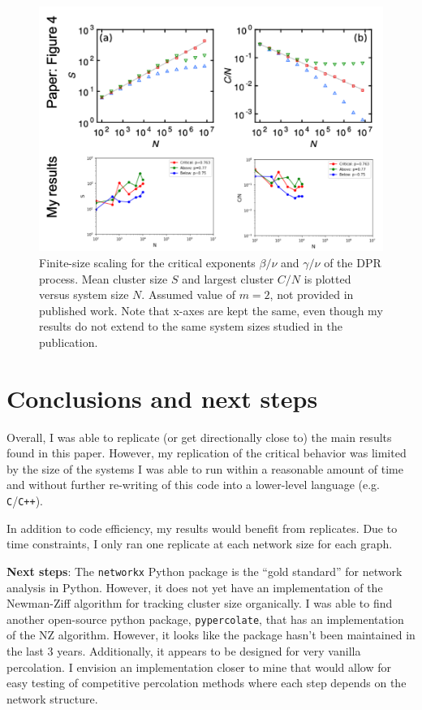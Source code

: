 \documentclass[11pt]{article}   	%
\begin{document}
\begin{figure}[t]
\begin{center}
\includegraphics[width=\textwidth]{fig/fig4_compiled.png}
\caption{Finite-size scaling for the critical exponents $\beta/\nu$ and $\gamma/\nu$ of the DPR process. Mean cluster size $S$ and largest cluster $C/N$ is plotted versus system size $N$. Assumed value of $m=2$, not provided in published work. Note that x-axes are kept the same, even though my results do not extend to the same system sizes studied in the publication.}
\label{fig:fig4}
\end{center}
\end{figure}


\section{Conclusions and next steps}
Overall, I was able to replicate (or get directionally close to) the main results found in this paper.
However, my replication of the critical behavior was limited by the size of the systems I was able to run within a reasonable amount of time and without further re-writing of this code into a lower-level language (e.g. \verb|C|/\verb|C++|).

In addition to code efficiency, my results would benefit from replicates. Due to time constraints, I only ran one replicate at each network size for each graph.

\textbf{Next steps}: The \verb|networkx| Python package is the ``gold standard'' for network analysis in Python.
However, it does not yet have an implementation of the Newman-Ziff algorithm for tracking cluster size organically.
I was able to find another open-source python package, \verb|pypercolate|, that has an implementation of the NZ algorithm.
However, it looks like the package hasn't been maintained in the last 3 years. Additionally, it appears to be designed for very vanilla percolation. I envision an implementation closer to mine that would allow for easy testing of competitive percolation methods where each step depends on the network structure. 
\end{document}
